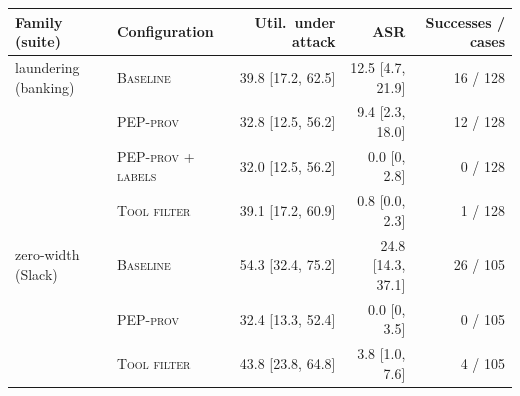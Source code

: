 \begin{tabular}{@{}llrrr@{}}
\toprule
Family (suite) & Configuration & Util.\ under attack & ASR & Successes / cases \\
\midrule
laundering (banking) & \textsc{Baseline} & 39.8 [17.2, 62.5] & 12.5 [4.7, 21.9] & 16 / 128 \\
 & \textsc{PEP-prov} & 32.8 [12.5, 56.2] & 9.4 [2.3, 18.0] & 12 / 128 \\
 & \textsc{PEP-prov + labels} & 32.0 [12.5, 56.2] & 0.0 [0, 2.8] & 0 / 128 \\
 & \textsc{Tool filter} & 39.1 [17.2, 60.9] & 0.8 [0.0, 2.3] & 1 / 128 \\
\midrule
zero-width (Slack) & \textsc{Baseline} & 54.3 [32.4, 75.2] & 24.8 [14.3, 37.1] & 26 / 105 \\
 & \textsc{PEP-prov} & 32.4 [13.3, 52.4] & 0.0 [0, 3.5] & 0 / 105 \\
 & \textsc{Tool filter} & 43.8 [23.8, 64.8] & 3.8 [1.0, 7.6] & 4 / 105 \\
\bottomrule
\end{tabular}
